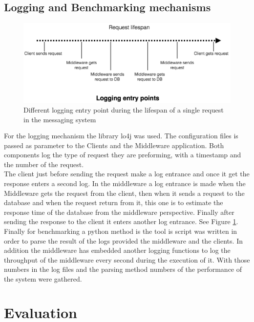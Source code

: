 \subsection{Logging and Benchmarking mechanisms}\label{sec:logging-and-benchmarking-mechanisms}
\begin{figure}[h!]
	\centering
	\includegraphics[scale=0.3]{logging.png}
	\caption{Different logging entry point during the lifespan of a single request in the messaging system}
	\label{logging}
\end{figure}
 For the logging mechanism the library lo4j was used. The configuration files is passed as parameter to the Clients and the Middleware application. Both components log the type of request they are preforming, with a timestamp and the number of the request.\\
 
The client just before sending the request make a log entrance and once it get the response enters a second log. In the middleware a log entrance is made when the Middleware gets the request from the client, then when it sends a request to the database and when the request return from it, this one is to estimate the response time of the database from the middleware perspective. Finally after sending the response to the client it enters another log entrance. See Figure \ref{logging}.\\

Finally for benchmarking a python method is the tool is script was written in order to parse the result of the logs provided the middleware and the clients. In addition the middleware has embedded another logging functions to log the throughput of the middleware every second during the execution of it. With those numbers in the log files and the parsing method numbers of the performance of the system were gathered.

\section{Evaluation}\label{sec:evaluation}


